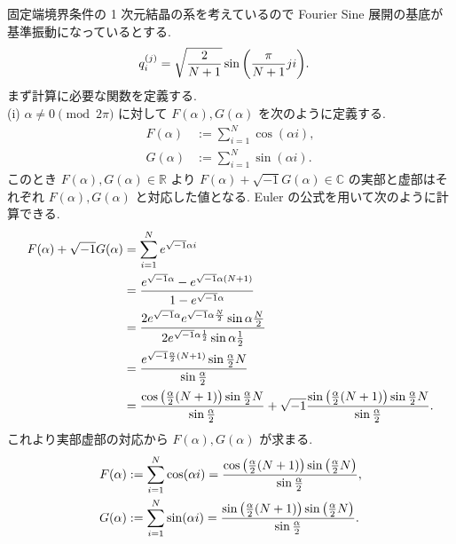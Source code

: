 \documentclass[uplatex,dvipdfmx,a4paper,11pt]{jlreq}
\theoremstyle{definition}
\newcommand{\RR}{\mathbb{R}}
\newcommand{\CC}{\mathbb{C}}
\begin{document}
固定端境界条件の 1 次元結晶の系を考えているので Fourier Sine 展開の基底が基準振動になっているとする.
\begin{align}
  q_i^{(j)} & = \sqrt{\frac{2}{N+1}}\sin\qty(\frac{\pi}{N+1}ji).
\end{align}
まず計算に必要な関数を定義する. \\

(i) $\alpha \neq 0 \pmod{2\pi}$ に対して $F(\alpha), G(\alpha)$ を次のように定義する.
\begin{align}
  F(\alpha) & := \sum_{i=1}^{N}\cos(\alpha i), \\
  G(\alpha) & := \sum_{i=1}^{N}\sin(\alpha i).
\end{align}
このとき $F(\alpha), G(\alpha)\in\RR$ より $F(\alpha) + \sqrt{-1}G(\alpha)\in\CC$ の実部と虚部はそれぞれ $F(\alpha), G(\alpha)$ と対応した値となる. Euler の公式を用いて次のように計算できる.
\begin{align}
  F(\alpha) + \sqrt{-1}G(\alpha) & = \sum_{i=1}^{N}e^{\sqrt{-1}\alpha i}                                                                                                                                                     \\
                                 & = \frac{e^{\sqrt{-1}\alpha} - e^{\sqrt{-1}\alpha (N+1)}}{1 - e^{\sqrt{-1}\alpha}}                                                                                                         \\
                                 & = \frac{2e^{\sqrt{-1}\alpha}e^{\sqrt{-1}\alpha \frac{N}{2}}\sin{\alpha \frac{N}{2}}}{2e^{\sqrt{-1}\alpha\frac{1}{2}}\sin{\alpha\frac{1}{2}}}                                              \\
                                 & = \frac{e^{\sqrt{-1}\frac{\alpha}{2}(N+1)}\sin{\frac{\alpha}{2}N}}{\sin{\frac{\alpha}{2}}}                                                                                                \\
                                 & = \frac{\cos\qty(\frac{\alpha}{2}(N+1))\sin{\frac{\alpha}{2}N}}{\sin{\frac{\alpha}{2}}} + \sqrt{-1}\frac{\sin\qty(\frac{\alpha}{2}(N+1))\sin{\frac{\alpha}{2}N}}{\sin{\frac{\alpha}{2}}}.
\end{align}
これより実部虚部の対応から $F(\alpha), G(\alpha)$ が求まる.
\begin{align}
  F(\alpha) & := \sum_{i=1}^{N}\cos(\alpha i) = \frac{\cos\qty(\frac{\alpha}{2}(N+1))\sin\qty(\frac{\alpha}{2}N)}{\sin{\frac{\alpha}{2}}}, \\
  G(\alpha) & := \sum_{i=1}^{N}\sin(\alpha i) = \frac{\sin\qty(\frac{\alpha}{2}(N+1))\sin\qty(\frac{\alpha}{2}N)}{\sin{\frac{\alpha}{2}}}.
\end{align}
\end{document}
